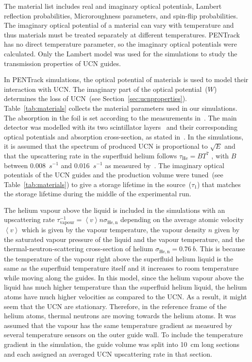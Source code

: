 The material list includes real and imaginary optical potentials,
Lambert reflection probabilities, Microroughness parameters, and
spin-flip probabilities. The imaginary optical potential of a material
can vary with temperature and thus materials must be treated
separately at different temperatures. PENTrack has no direct
temperature parameter, so the imaginary optical potentials were
calculated. Only the Lambert model was used for the simulations to
study the transmission properties of UCN guides.





In PENTrack simulations, the optical potential of materials is used to
model their interaction with UCN. The imaginary part of the optical
potential~($W$) determines the loss of UCN~(see
Section~\ref{sec:ucnproperties}). Table~\ref{tab:materials} collects
the material parameters used in our simulations. The absorption in the
foil is set according to the measurements
in~\cite{atchison2009transmission}. The main detector was modelled with
its two scintillator layers~\cite{jamieson2017characterization} and
their corresponding optical potentials and absorption cross-section,
as stated in~\cite{Ban2016}. In the simulations, it is assumed that
the spectrum of produced UCN is proportional to $\sqrt{E}$ and that
the upscattering rate in the superfluid helium follows
$\tau_\mathrm{He} = B T^7$ , with $B$ between 0.008~$s^{-1}$ and
0.016~$s^{-1}$ as measured by~\cite{Leung2016}. The imaginary optical
potentials of the UCN guides and the production volume were tuned~(see
Table~\ref{tab:materials}) to give a storage lifetime in the
source~($\tau_1$) that matches the storage lifetime during the middle
of the experimental run.


The helium vapour above the liquid is included in the simulations with
an upscattering rate
$\tau^{-1}_\mathrm{vapour} = \left< v \right> n \sigma_\mathrm{He,n}$
depending on the average atomic velocity $\left < v \right>$ which is
given by the vapour temperature, the vapour density $n$ given by the
saturated vapour pressure of the liquid and the vapour temperature,
and the thermal-neutron-scattering cross-section of helium
$\sigma_\mathrm{He,n} = 0.76~b$. This is because the temperature of
the vapour right above the superfluid helium liquid is the same as the
superfluid temperature itself and it increases to room temperature
while moving along the guides. In this model, since the helium vapour
above the liquid has much higher temperature than the superfluid
helium liquid, the helium atoms have much higher velocities as
compared to the UCN. As a result, it might seem that the UCN are
stationary. Therefore, in the reference frame of the helium atoms,
thermal neutrons are moving towards the helium atoms.  It was assumed
that the vapour has the same temperature gradient as measured by
several temperature sensors on the outer guide wall. To include the
temperature gradient in the simulation, the guide volume was split
into 10~cm long sections and each assigned an averaged UCN
upscattering rate in that section.


